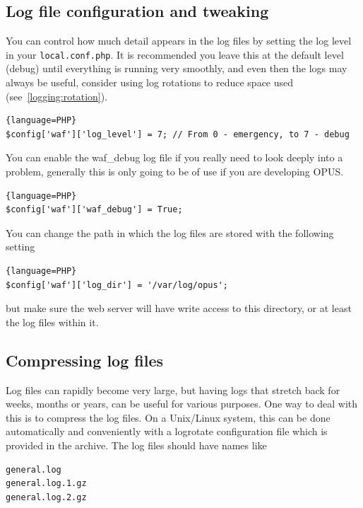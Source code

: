 \documentclass[12 pt]{book}
\begin{document}
\subsection{Log file configuration and tweaking}

You can control how much detail appears in the log files by setting the log level in your \lstinline!local.conf.php!.
It is recommended you leave this at the default level (debug) until everything is running very smoothly, and even then
the logs may always be useful, consider using log rotations to reduce space used (see~\ref{logging:rotation}).

\begin{lstlisting}{language=PHP}
$config['waf']['log_level'] = 7; // From 0 - emergency, to 7 - debug
\end{lstlisting}

You can enable the waf_debug log file if you really need to look deeply into a problem, generally this is only going
to be of use if you are developing OPUS.

\begin{lstlisting}{language=PHP}
$config['waf']['waf_debug'] = True;
\end{lstlisting}

You can change the path in which the log files are stored with the following setting

\begin{lstlisting}{language=PHP}
$config['waf']['log_dir'] = '/var/log/opus';
\end{lstlisting}

but make sure the web server will have write access to this directory, or at least the log files within it.


\subsection{Compressing log files}

Log files can rapidly become very large, but having logs that stretch back for weeks, months or years, can
be useful for various purposes. One way to deal with this is to compress the log files. On a Unix/Linux
system, this can be done automatically and conveniently with a logrotate configuration file which is
provided in the archive. The log files should have names like

\begin{lstlisting}
general.log
general.log.1.gz
general.log.2.gz
\end{lstlisting}
\end{document}
